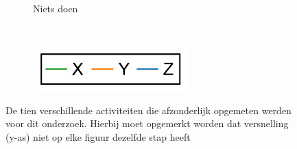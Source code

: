 \documentclass{article}
\begin{document}
\begin{figure}
\begin{subfigure}[b]{.49\linewidth}
    \caption{Niets doen}\label{fig:1j}
  \end{subfigure} \\
  \begin{subfigure}[b]{.49\linewidth}
    \centering
    \includegraphics[width=.25\textwidth]{figures/legend}
  \end{subfigure}
  

  \caption{De tien verschillende activiteiten die afzonderlijk opgemeten werden voor dit onderzoek. Hierbij moet opgemerkt worden dat versnelling (y-as) niet op elke figuur dezelfde stap heeft }\label{fig:1}
\end{figure}
\end{document}
